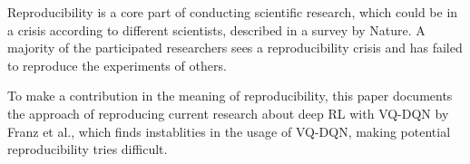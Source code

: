 Reproducibility is a core part of conducting scientific research, which could be in a crisis according to different scientists, described in a survey by Nature.
A majority of the participated researchers sees a reproducibility crisis and has failed to reproduce the experiments of others.\autocite{crisis}

To make a contribution in the meaning of reproducibility, this paper documents the approach of reproducing current research about deep \ac{RL} with \ac{VQ-DQN} by Franz et al.\autocite{instabilities}, which finds instablities in the usage of \ac{VQ-DQN}, making potential reproducibility tries difficult.

